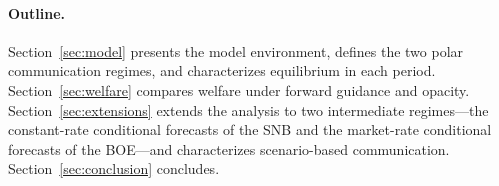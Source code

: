 \paragraph{Outline.}
Section~\ref{sec:model} presents the model environment, defines the two polar
communication regimes, and characterizes equilibrium in each period.
Section~\ref{sec:welfare} compares welfare under forward guidance and opacity.
Section~\ref{sec:extensions} extends the analysis to two intermediate regimes---the
constant-rate conditional forecasts of the SNB and the market-rate conditional
forecasts of the BOE---and characterizes scenario-based communication.
Section~\ref{sec:conclusion} concludes.
